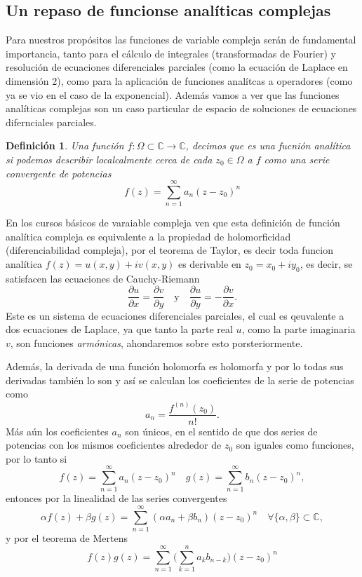 \documentclass[letterpaper]{book}
\newtheorem{def.}{Definici\'on}[section]
\newcommand{\om}{\ensuremath{\Omega}}
\newcommand{\co}{\ensuremath{\mathbb C }}
\begin{document}
\subsection{Un repaso de funcionse analíticas complejas}
\noindent Para nuestros propósitos las funciones de variable compleja serán de fundamental importancia, tanto para el cálculo de integrales (transformadas de Fourier) y resolución de ecuaciones diferenciales parciales (como la ecuación de Laplace en dimensión 2), como para la aplicación de funciones analítcas a operadores (como ya se vio en el caso de la exponencial). Además vamos a ver que las funciones analíticas complejas son un caso particular de espacio de soluciones de ecuaciones difernciales parciales.
\begin{def.}
Una función \(f:\om\subset\co\to\co\), decimos que es una fucnión \emph{analítica} si podemos describir localcalmente cerca de cada \(z_0\in\om\) a \(f\) como una serie convergente de potencias
\[
f(z)=\sum_{n=1}^{\infty}a_n(z-z_0)^n
\]
\end{def.}
En los cursos básicos de varaiable compleja ven que esta definición de función analítica compleja es equivalente a la propiedad de holomorficidad (diferenciabilidad compleja), por el teorema de Taylor, es decir toda funcion analítica \(f(z) = u(x, y) + iv(x, y)\) es derivable en \(z_0 = x_0 + iy_0\), es  decir, se satisfacen las ecuaciones de Cauchy-Riemann
\[
\frac{\partial u}{\partial x} = \frac{\partial v}{\partial y} \quad \text{y} \quad \frac{\partial u}{\partial y} = -\frac{\partial v}{\partial x}.
\]
\noindent Este es un sistema de ecuaciones diferenciales parciales, el cual es qeuvalente a dos ecuaciones de Laplace, ya que tanto la parte real \(u\), como la parte imaginaria \(v\), son funciones \emph{armónicas}, ahondaremos sobre esto porsteriormente.

Además, la derivada de una función holomorfa es holomorfa y por lo todas sus derivadas también lo son y así se calculan los coeficientes de la serie de potencias como
\[
a_n = \frac{f^{(n)}(z_0)}{n!}.
\]
Más aún los coeficientes \(a_n\) son únicos, en el sentido de que dos series de potencias con los mismos coeficientes alrededor de \(z_0\) son iguales como funciones, por lo tanto si
\[
f(z)=\sum_{n=1}^{\infty}a_n(z-z_0)^n\quad g(z)=\sum_{n=1}^{\infty}b_n(z-z_0)^n,
\]
entonces por la linealidad de las series convergentes
\[
\alpha f(z)+\beta g(z)=\sum_{n=1}^{\infty}(\alpha a_n+\beta b_n)(z-z_0)^n\quad\forall\{\alpha,\beta\}\subset\co,
\]
y por el teorema de Mertens
\[
f(z)g(z)=\sum_{n=1}^{\infty}\Big( \sum_{k=1}^n a_k b_{n-k}\Big)(z-z_0)^n
\]
\end{document}
